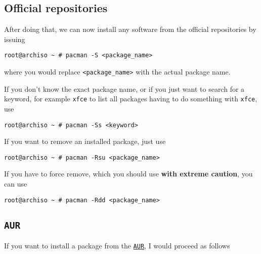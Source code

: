 \documentclass[9pt]{report}
\newenvironment{CAUTION}
{\begin{tcolorbox}[colback=admonitionBG,coltitle=draculaBG,colframe=draculaPink,colbacktitle=draculaPink,title=CAUTION]}
{\end{tcolorbox}}
\begin{document}
\newpage

\hypertarget{x-official-repositories}{\subsection{Official repositories}}
After doing that, we can now install any software from the official repositories by issuing

\begin{verbatim}
root@archiso ~ # pacman -S <package_name>
\end{verbatim}

where you would replace \texttt{<package\_name>} with the actual package name.


If you don’t know the exact package name, or if you just want to search for a keyword, for example \texttt{xfce} to list all packages having to do something with \texttt{xfce}, use


\begin{verbatim}
root@archiso ~ # pacman -Ss <keyword>
\end{verbatim}

If you want to remove an installed package, just use


\begin{verbatim}
root@archiso ~ # pacman -Rsu <package_name>
\end{verbatim}

\begin{CAUTION}
    If you have to force remove, which you should use \textbf{with extreme caution}, you can use

    \begin{verbatim}
root@archiso ~ # pacman -Rdd <package_name>
    \end{verbatim}
\end{CAUTION}

\newpage

\hypertarget{x-aur}{\subsection{\texttt{AUR}}}
If you want to install a package from the \href{https://aur.archlinux.org/}{\texttt{AUR}}, I would proceed as follows
\end{document}
